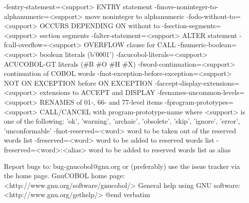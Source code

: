   -fentry-statement=<support> ENTRY statement
  -fmove-noninteger-to-alphanumeric=<support> move noninteger to alphanumeric
  -fodo-without-to=<support> OCCURS DEPENDING ON without to
  -fsection-segments=<support> section segments
  -falter-statement=<support> ALTER statement
  -fcall-overflow=<support> OVERFLOW clause for CALL
  -fnumeric-boolean=<support> boolean literals (b'0001')
  -facucobol-literals=<support> ACUCOBOL-GT literals (#B #O #H #X)
  -fword-continuation=<support> continuation of COBOL words
  -fnot-exception-before-exception=<support> NOT ON EXCEPTION before ON EXCEPTION
  -faccept-display-extensions=<support> extensions to ACCEPT and DISPLAY
  -frenames-uncommon-levels=<support> RENAMES of 01-, 66- and 77-level items
  -fprogram-prototypes=<support> CALL/CANCEL with program-prototype-name
	where <support> is one of the following:
	'ok', 'warning', 'archaic', 'obsolete', 'skip', 'ignore', 'error', 'unconformable'
  -fnot-reserved=<word> word to be taken out of the reserved words list
  -freserved=<word>     word to be added to reserved words list
  -freserved=<word>:<alias> word to be added to reserved words list as alias


Report bugs to: bug-gnucobol@gnu.org
or (preferably) use the issue tracker via the home page.
GnuCOBOL home page: <http://www.gnu.org/software/gnucobol/>
General help using GNU software: <http://www.gnu.org/gethelp/>
@end verbatim

